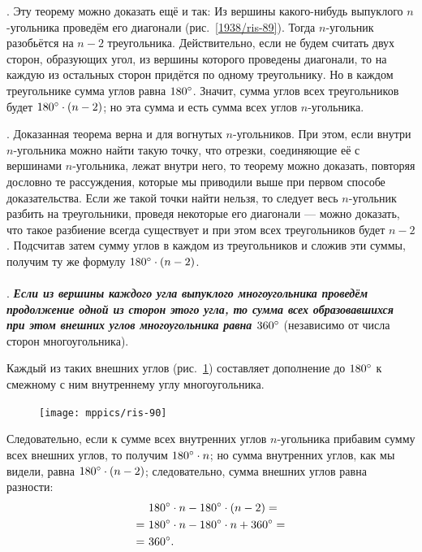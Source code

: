 \documentclass[twoside]{book}
\begin{document}
\smallskip
\mbox{.}
Эту теорему можно доказать ещё и так:
Из вершины какого-нибудь выпуклого $n$-угольника проведём его диагонали (рис.~\ref{1938/ris-89}).
Тогда $n$-угольник разобьётся на $n-2$ треугольника.
Действительно, если не будем считать двух сторон, образующих угол, из вершины которого проведены диагонали, то на каждую из остальных сторон придётся по одному треугольнику.
Но в каждом треугольнике сумма углов равна $180\degree$.
Значит, сумма углов всех треугольников будет $180\degree\cdot(n-2)$;
но эта сумма и есть сумма всех углов $n$-угольника.

\medskip

\smallskip
{}.
Доказанная теорема верна и для вогнутых $n$-угольников.
При этом, если внутри $n$-угольника можно найти такую точку, что отрезки, соединяющие её с вершинами $n$-угольника, лежат внутри него, то теорему можно доказать, повторяя дословно те рассуждения, которые мы приводили выше при первом способе доказательства.
Если же такой точки найти нельзя, то следует весь $n$-угольник разбить на треугольники, проведя некоторые его диагонали — можно доказать, что такое разбиение всегда существует и при этом всех треугольников будет $n-2$.
Подсчитав затем сумму углов в каждом из треугольников и сложив эти суммы, получим ту же формулу $180\degree\cdot(n - 2)$.

\paragraph{}\label{1938/83}
\mbox{.}
\textbf{\emph{Если из вершины каждого угла выпуклого многоугольника проведём продолжение одной из сторон этого угла, то сумма всех образовавшихся при этом внешних углов многоугольника равна $360\degree$}} (независимо от числа сторон многоугольника).

Каждый из таких внешних углов (рис.~\ref{1938/ris-90}) составляет дополнение до $180\degree$ к смежному с ним внутреннему углу многоугольника.

{

\begin{figure}
\centering
\texttt{[image: mppics/ris-90]}
\caption{}\label{1938/ris-90}
\end{figure}

Следовательно, если к сумме всех внутренних углов $n$-угольника прибавим сумму всех внешних углов, то получим $180\degree\cdot n$;
но сумма внутренних углов, как мы видели, равна $180\degree\cdot (n - 2)$;
следовательно, сумма внешних углов равна разности:
\begin{align*}
&180\degree\cdot n-180\degree\cdot (n - 2)=
\\
=~&180\degree\cdot n-180\degree\cdot n+360\degree=
\\
=~&360\degree.
\end{align*}

}
\end{document}
